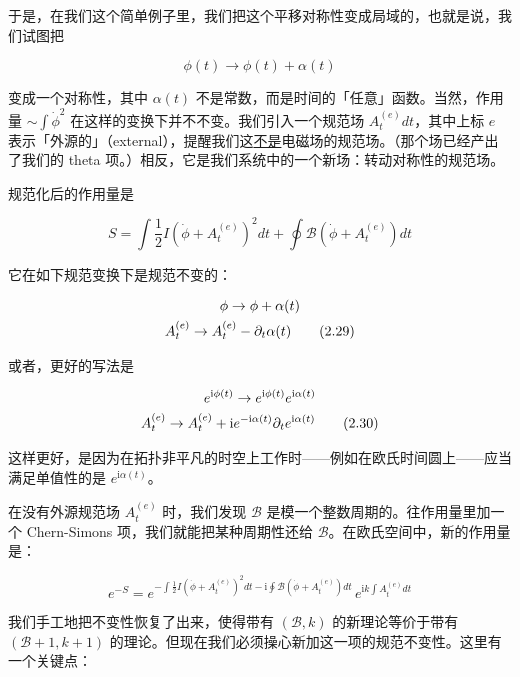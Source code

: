 于是，在我们这个简单例子里，我们把这个平移对称性变成局域的，也就是说，我们试图把

\begin{equation}
  \phi(t)\to\phi(t)+\alpha(t)
  \tag{2.27}
  \label{eq:2.27}
\end{equation}

变成一个对称性，其中 $\alpha(t)$ 不是常数，而是时间的「任意」函数。当然，作用量 $\sim\int\dot\phi^{2}$ 在这样的变换下并不不变。我们引入一个规范场 $A_t^{(e)}dt$，其中上标 $e$ 表示「外源的」（external），提醒我们这\underline{不是}电磁场的规范场。（那个场已经产出了我们的 theta 项。）相反，它是我们系统中的一个新场：转动对称性的规范场。

规范化后的作用量是

\begin{equation}
  S=\int\frac{1}{2}I(\dot\phi+A_t^{(e)})^{2}dt+\oint\mathcal{B}(\dot\phi+A_t^{(e)})dt
  \tag{2.28}
  \label{eq:2.28}
\end{equation}

它在如下规范变换下是规范不变的：

\begin{gather}
  \phi\to\phi+\alpha(t)\notag\\
  A_t^{(e)}\to A_t^{(e)}-\partial_t\alpha(t)
  \tag{2.29}
  \label{eq:2.29}
\end{gather}

或者，更好的写法是

\begin{gather}
  e^{\mathrm{i}\phi(t)}\to e^{\mathrm{i}\phi(t)}e^{\mathrm{i}\alpha(t)}\notag\\
  A_t^{(e)}\to A_t^{(e)}+\mathrm{i}e^{-\mathrm{i}\alpha(t)}\partial_te^{\mathrm{i}\alpha(t)}
  \tag{2.30}
  \label{eq:2.30}
\end{gather}

这样更好，是因为在拓扑非平凡的时空上工作时——例如在欧氏时间圆上——应当满足单值性的是 $e^{\mathrm{i}\alpha(t)}$。

在没有外源规范场 $A_t^{(e)}$ 时，我们发现 $\mathcal{B}$ 是模一个整数周期的。往作用量里加一个 Chern-Simons 项，我们就能把某种周期性还给 $\mathcal{B}$。在欧氏空间中，新的作用量是：

\begin{equation}
  e^{-S}=e^{-\int\frac{1}{2}I(\dot\phi+A_t^{(e)})^{2}dt-\mathrm{i}\oint\mathcal{B}(\dot\phi+A_t^{(e)})dt}\,e^{\mathrm{i}k\int A_t^{(e)}dt}
  \tag{2.31}
  \label{eq:2.31}
\end{equation}

我们手工地把不变性恢复了出来，使得带有 $(\mathcal{B},k)$ 的新理论等价于带有 $(\mathcal{B}+1,k+1)$ 的理论。但现在我们必须操心新加这一项的规范不变性。这里有一个关键点：


